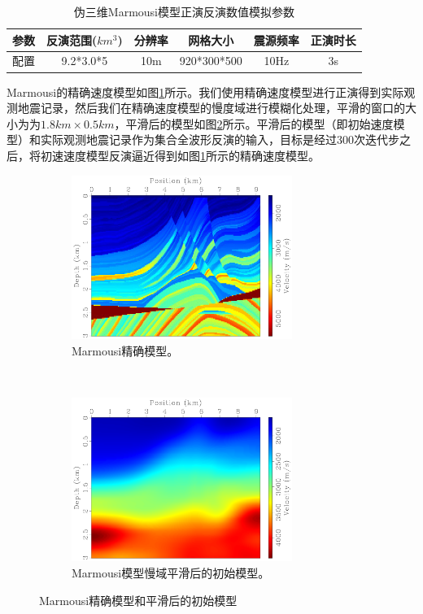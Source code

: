 \documentclass[degree=doctor]{thuthesis}
\begin{document}
\begin{table}[ht]
\centering
\caption{伪三维Marmousi模型正演反演数值模拟参数}
\label{tb:伪三维Marmousi模型正演反演数值模拟参数}
\begin{tabular}{cccccc}
\hline
参数 & 反演范围($km^3$) & 分辨率 & 网格大小        & 震源频率 & 正演时长 \\\hline 
配置 & 9.2*3.0*5     & 10m   & 920*300*500   & 10Hz    & 3s  \\\hline
\end{tabular}
\end{table}

Marmousi的精确速度模型如图\ref{fig:Marmousi精确模型}所示。我们使用精确速度模型进行正演得到实际观测地震记录，然后我们在精确速度模型的慢度域进行模糊化处理，平滑的窗口的大小为为$1.8km\times 0.5km$，平滑后的模型如图\ref{fig:Marmousi模型慢域平滑后的初始模型}所示。平滑后的模型（即初始速度模型）和实际观测地震记录作为集合全波形反演的输入，目标是经过300次迭代步之后，将初速速度模型反演逼近得到如图\ref{fig:Marmousi精确模型}所示的精确速度模型。

\begin{figure}[ht]
    \centering
    \begin{subfigure}[b]{0.5\textwidth}
        \centering
        \includegraphics[height=2.1in]{marmvel.pdf}
        \caption{Marmousi精确模型。}
        \label{fig:Marmousi精确模型}
    \end{subfigure}%
    ~
    \begin{subfigure}[b]{0.5\textwidth}
        \centering
        \includegraphics[height=2.1in]{marmvel_smoothed.pdf}
        \caption{Marmousi模型慢域平滑后的初始模型。}
        \label{fig:Marmousi模型慢域平滑后的初始模型}
    \end{subfigure}
    \caption{Marmousi精确模型和平滑后的初始模型}
    \label{fig:Marmousi精确模型和平滑后的初始模型}
\end{figure}
\end{document}
